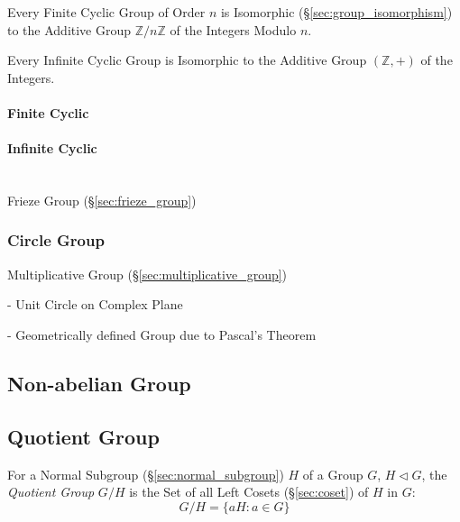 Every Finite Cyclic Group of Order $n$ is Isomorphic
(\S\ref{sec:group_isomorphism}) to the Additive Group
$\mathbb{Z}/n\mathbb{Z}$ of the Integers Modulo $n$.

Every Infinite Cyclic Group is Isomorphic to the Additive Group
$(\mathbb{Z}, +)$ of the Integers.



\paragraph{Finite Cyclic}\label{sec:finite_cyclic}

\paragraph{Infinite Cyclic}\label{sec:infinite_cyclic}
\hfill \\

Frieze Group (\S\ref{sec:frieze_group})



\subsubsection{Circle Group}\label{sec:circle_group}

Multiplicative Group (\S\ref{sec:multiplicative_group})

- Unit Circle on Complex Plane

- Geometrically defined Group due to Pascal's Theorem
  \cite{lemmermeyer-shirali09}



\subsection{Non-abelian Group}\label{sec:nonabelian_group}

\subsection{Quotient Group}\label{sec:quotient_group}

For a Normal Subgroup (\S\ref{sec:normal_subgroup}) $H$ of a Group
$G$, $H \triangleleft G$, the \emph{Quotient Group} $G/H$ is the Set
of all Left Cosets (\S\ref{sec:coset}) of $H$ in $G$:
\[
    G/H = \{ aH : a \in G \}
\]



